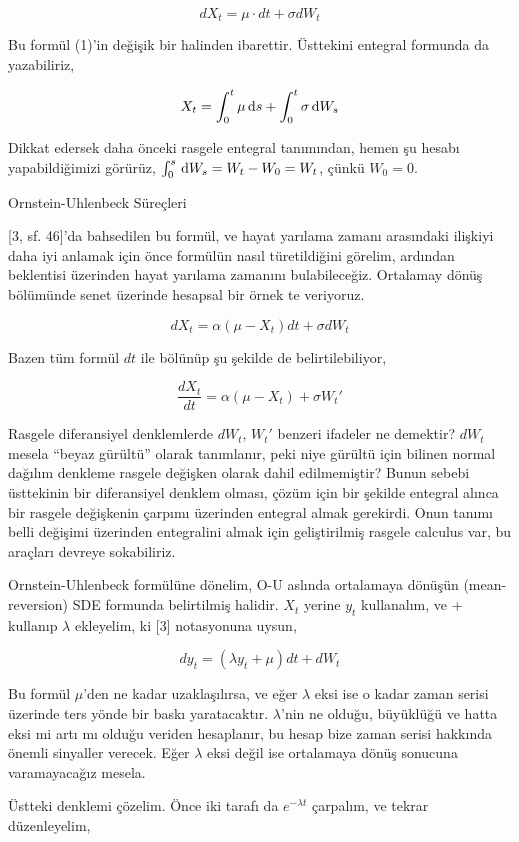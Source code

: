 \documentclass[12pt,fleqn]{article}\usepackage{../../common}
\begin{document}
$$ dX_t = \mu \cdot dt + \sigma dW_t $$

Bu formül (1)'in değişik bir halinden ibarettir. Üsttekini entegral
formunda da yazabiliriz, 

$$ X_t = \int _{0}^{t}\mu \,\mathrm{d} s + \int _{ 0}^{t} \sigma \,\mathrm{d} W_s $$

Dikkat edersek daha önceki rasgele entegral tanımından, hemen şu hesabı
yapabildiğimizi görürüz, $\int _{0}^{s} \,\mathrm{d} W_s = W_t - W_0 = W_t$, çünkü
$W_0=0$. 

Ornstein-Uhlenbeck Süreçleri

[3, sf. 46]'da bahsedilen bu formül, ve hayat yarılama zamanı arasındaki
ilişkiyi daha iyi anlamak için önce formülün nasıl türetildiğini görelim,
ardından beklentisi üzerinden hayat yarılama zamanını bulabileceğiz. Ortalamay
dönüş bölümünde senet üzerinde hesapsal bir örnek te veriyoruz.

$$ dX_t = \alpha(\mu - X_t)dt + \sigma dW_t $$

Bazen tüm formül $dt$ ile bölünüp şu şekilde de belirtilebiliyor, 

$$ \frac{dX_t}{dt} = \alpha(\mu - X_t) + \sigma W_t' $$

Rasgele diferansiyel denklemlerde $dW_t$, $W_t'$ benzeri ifadeler ne demektir?
$dW_t$ mesela ``beyaz gürültü'' olarak tanımlanır, peki niye gürültü için
bilinen normal dağılım denkleme rasgele değişken olarak dahil edilmemiştir?
Bunun sebebi üsttekinin bir diferansiyel denklem olması, çözüm için bir şekilde
entegral alınca bir rasgele değişkenin çarpımı üzerinden entegral almak
gerekirdi. Onun tanımı belli değişimi üzerinden entegralini almak için
geliştirilmiş rasgele calculus var, bu araçları devreye sokabiliriz.

Ornstein-Uhlenbeck formülüne dönelim, O-U aslında ortalamaya dönüşün
(mean-reversion) SDE formunda belirtilmiş halidir. $X_t$ yerine $y_t$
kullanalım, ve + kullanıp $\lambda$ ekleyelim, ki [3] notasyonuna uysun,

$$ dy_t = (\lambda y_t + \mu)dt + dW_t  $$

Bu formül $\mu$'den ne kadar uzaklaşılırsa, ve eğer $\lambda$ eksi ise o kadar
zaman serisi üzerinde ters yönde bir baskı yaratacaktır. $\lambda$'nin ne
olduğu, büyüklüğü ve hatta eksi mi artı mı olduğu veriden hesaplanır, bu hesap
bize zaman serisi hakkında önemli sinyaller verecek. Eğer $\lambda$ eksi değil
ise ortalamaya dönüş sonucuna varamayacağız mesela.

Üstteki denklemi çözelim. Önce iki tarafı da $e^{-\lambda t}$ çarpalım, ve
tekrar düzenleyelim,
\end{document}
